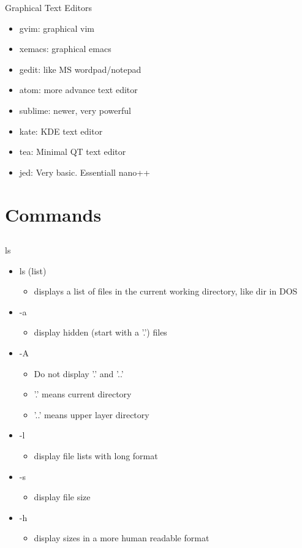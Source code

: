 \documentclass{beamer}
\begin{document}
\begin{frame}{Graphical Text Editors}
\begin{itemize}
\item gvim: graphical vim
\item xemacs: graphical emacs
\item gedit: like MS wordpad/notepad
\item atom: more advance text editor
\item sublime: newer, very powerful
\item kate: KDE text editor
\item tea: Minimal QT text editor
\item jed: Very basic.  Essentiall nano++
\end{itemize}
\end{frame}

\section{Commands}
\subsection{}
\begin{frame} {ls}
\begin{itemize}
\item ls (list)
\begin{itemize}
\item displays a list of files in the current working directory, like dir in DOS
\end{itemize}
\item -a 
\begin{itemize}
\item display hidden (start with a '.') files
\end{itemize}
\item -A
\begin{itemize}
\item Do not display '.' and '..'
\item '.' means current directory
\item '..' means upper layer directory
\end{itemize}
\item -l
\begin{itemize}
\item display file lists with long format
\end{itemize}
\item -s
\begin{itemize}
\item display file size
\end{itemize}
\item -h
\begin{itemize}
\item display sizes in a more human readable format
\end{itemize}
\end{itemize}
\end{frame}
\end{document}
